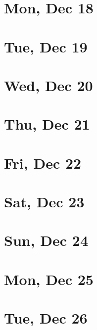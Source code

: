 	\section{Mon, Dec 18}
		
		
	\section{Tue, Dec 19}
		
		
	\section{Wed, Dec 20}
		
		
	\section{Thu, Dec 21}
		
		
	\section{Fri, Dec 22}
		
		
	\section{Sat, Dec 23}
		
		
	\section{Sun, Dec 24}
		
		
	\section{Mon, Dec 25}
		
		
	\section{Tue, Dec 26}
		
		
